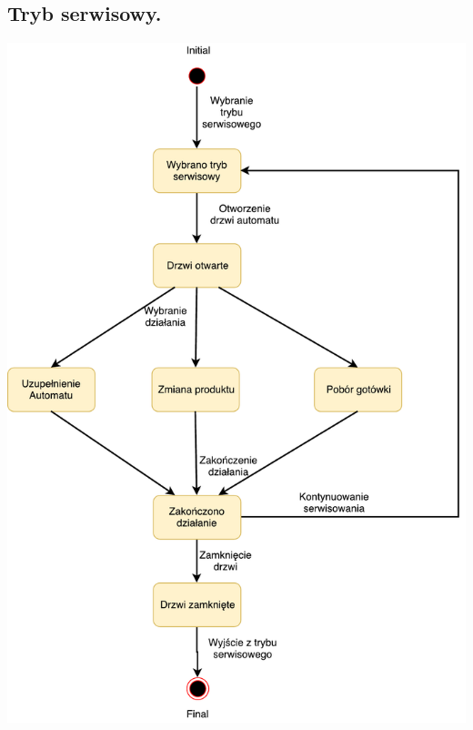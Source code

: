 \documentclass[11pt]{article}
\begin{document}
		\subsection{Tryb serwisowy.}
		\begin{center}
			\includegraphics[scale=0.75]{stanu4.pdf}
		\end{center}
\end{document}
